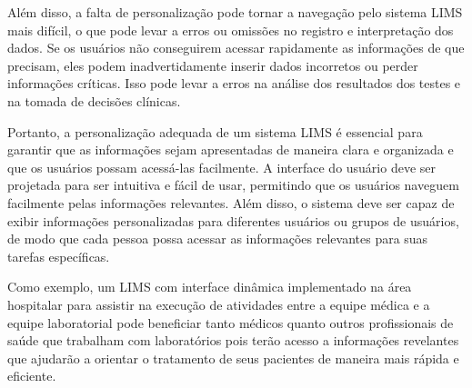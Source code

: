 Além disso, a falta de personalização pode tornar a navegação pelo sistema LIMS mais difícil, o que pode levar a erros ou omissões no registro e interpretação dos dados. Se os usuários não conseguirem acessar rapidamente as informações de que precisam, eles podem inadvertidamente inserir dados incorretos ou perder informações críticas. Isso pode levar a erros na análise dos resultados dos testes e na tomada de decisões clínicas.

Portanto, a personalização adequada de um sistema LIMS é essencial para garantir que as informações sejam apresentadas de maneira clara e organizada e que os usuários possam acessá-las facilmente. A interface do usuário deve ser projetada para ser intuitiva e fácil de usar, permitindo que os usuários naveguem facilmente pelas informações relevantes. Além disso, o sistema deve ser capaz de exibir informações personalizadas para diferentes usuários ou grupos de usuários, de modo que cada pessoa possa acessar as informações relevantes para suas tarefas específicas.


Como exemplo, um LIMS com interface dinâmica implementado na área hospitalar para assistir na execução de atividades entre a equipe médica e a equipe laboratorial pode beneficiar tanto médicos quanto outros profissionais de saúde que trabalham com laboratórios pois terão acesso a informações revelantes que ajudarão a orientar o tratamento de seus pacientes de maneira mais rápida e eficiente.